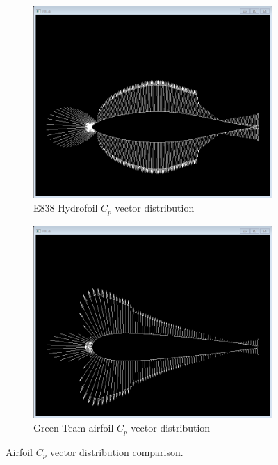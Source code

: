 \begin{figure}[H]
\centering
\begin{subfigure}[b]{.5\textwidth}
  \centering
  \includegraphics[width=0.9\linewidth]{Aeroshell/HydrofoilCpv.png}
  \caption{\label{fig:hydrofoil_cpv}E838 Hydrofoil $C_p$ vector distribution}
\end{subfigure}%
\begin{subfigure}[b]{.5\textwidth}
  \centering
  \includegraphics[width=0.9\linewidth]{Aeroshell/GreenTeamCpv.png}
  \caption{\label{fig:greenteam_cpv}Green Team airfoil $C_p$ vector distribution}
\end{subfigure}
\caption{\label{fig:cpv}Airfoil $C_p$ vector distribution comparison.}
\end{figure}

